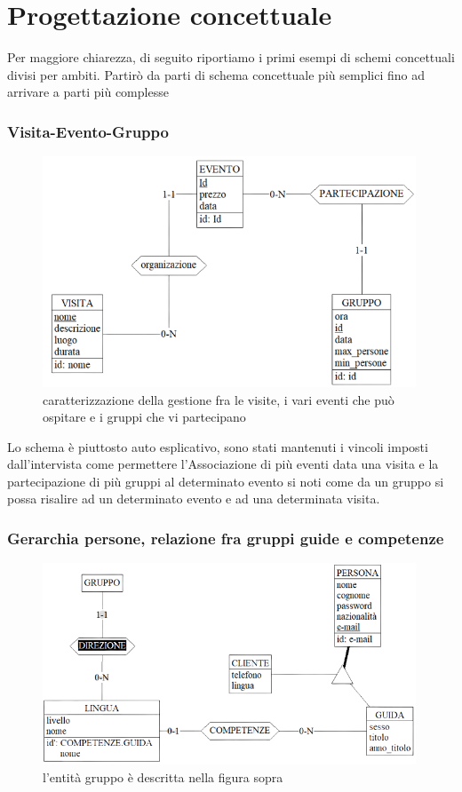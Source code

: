 \documentclass[a4paper,12pt]{report}
\begin{document}
\chapter{Progettazione concettuale}
Per maggiore chiarezza, di seguito riportiamo i primi esempi di schemi concettuali
divisi per ambiti. Partirò da parti di schema concettuale più semplici fino ad arrivare a parti più complesse
\subsection*{Visita-Evento-Gruppo}
\begin{figure}[H]
	\centering
	\includegraphics[width=0.99\textwidth]{evento-visita-gruppo.png}
	\caption[]{caratterizzazione della gestione fra le visite, i vari eventi che può ospitare e i gruppi che vi partecipano}
\end{figure}
Lo schema è piuttosto auto esplicativo, sono stati mantenuti i vincoli imposti
dall'intervista come permettere l'Associazione di più eventi data una visita e
la partecipazione di più gruppi al determinato evento si noti come da un gruppo
si possa risalire ad un determinato evento e ad una determinata visita.
\subsection*{Gerarchia persone, relazione fra gruppi guide e competenze}
\begin{figure}[H]
	\centering
	\includegraphics[width=0.99\textwidth]{gruppo-guide.png}
	\caption[]{l'entità gruppo è descritta nella figura sopra}
\end{figure}
\end{document}
